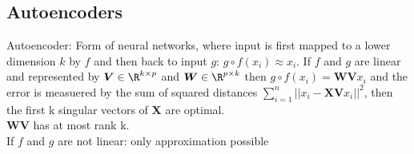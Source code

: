 \documentclass[english]{latex4ei/latex4ei_sheet}
\begin{document}
\begin{sectionbox}
\subsection{Autoencoders}
Autoencoder: Form of neural networks, where input is first mapped to a lower dimension $k$ by $f$ and then back to input $g$: $g\circ f(x_i) \approx x_i$.
If $f$ and $g$ are linear and represented by $\boldsymbol{V}\in\R^{k\times p}$ and $\boldsymbol{W}\in\R^{p\times k}$ then $g\circ f(x_i)=\boldsymbol{WV}x_i$ and the error is measuered by the sum of squared distances $\sum_{i=1}^n||x_i-\boldsymbol{XV}x_i||^2$, then the first k singular vectors of \textbf{X} are optimal. \\
\textbf{WV} has at most rank k.\\
If $f$ and $g$ are not linear: only approximation possible
\end{sectionbox}
\end{document}
